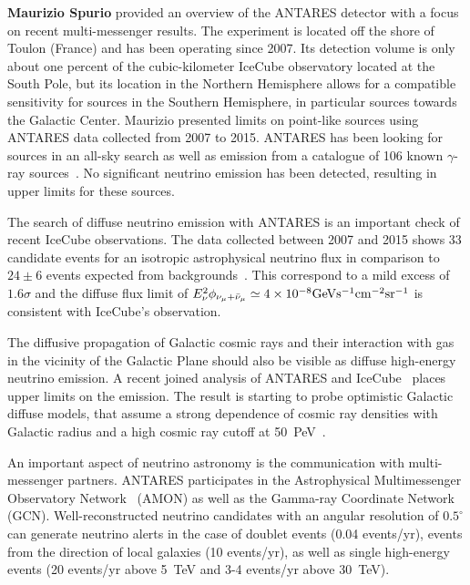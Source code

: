 \documentclass{PoS}
\begin{document}
{\bf Maurizio Spurio} provided an overview of the ANTARES detector with a focus on recent multi-messenger results. The experiment is located off the shore of Toulon (France) and has been operating since 2007. Its detection volume is only about one percent of the cubic-kilometer IceCube observatory located at the South Pole, but its location in the Northern Hemisphere allows for a compatible sensitivity for sources in the Southern Hemisphere, in particular sources towards the Galactic Center. Maurizio presented limits on point-like sources using ANTARES data collected from 2007 to 2015. ANTARES has been looking for sources in an all-sky search as well as emission from a catalogue of 106 known $\gamma$-ray sources~\cite{Albert:2017ohr}. No significant neutrino emission has been detected, resulting in upper limits for these sources.

The search of diffuse neutrino emission with ANTARES is an important check of recent IceCube observations. The data collected between 2007 and 2015 shows 33 candidate events for an isotropic astrophysical neutrino flux in comparison to $24\pm6$ events expected from backgrounds~\cite{Albert:2017nsd}. This correspond to a mild excess of $1.6\sigma$ and the diffuse flux limit of $E_\nu^2\phi_{\nu_\mu+\bar\nu_\mu}\simeq 4\times10^{-8} {\rm GeV} {\rm s}^{-1} {\rm cm}^{-2} {\rm sr}^{-1}$ is consistent with IceCube's observation. 

The diffusive propagation of Galactic cosmic rays and their interaction with gas in the vicinity of the Galactic Plane should also be visible as diffuse high-energy neutrino emission. A recent joined analysis of ANTARES and IceCube~\cite{Albert:2018vxw} places upper limits on the emission. The result is starting to probe optimistic Galactic diffuse models, that assume a strong dependence of cosmic ray densities with Galactic radius and a high cosmic ray cutoff at 50~PeV~\cite{Gaggero:2015xza}.

An important aspect of neutrino astronomy is the communication with multi-messenger partners. ANTARES participates in the Astrophysical Multimessenger Observatory Network~\cite{Smith:2012eu,AMON} (AMON) as well as the Gamma-ray Coordinate Network~\cite{GCN} (GCN). Well-reconstructed neutrino candidates with an angular resolution of $0.5^\circ$ can generate neutrino alerts in the case of doublet events (0.04 events/yr), events from the direction of local galaxies (10 events/yr), as well as single high-energy events (20 events/yr above 5~TeV and 3-4 events/yr above 30~TeV). 
\end{document}
